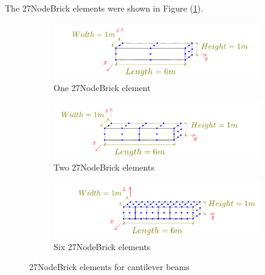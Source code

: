 \documentclass[fleqn,11pt,letter]{article}
\begin{document}
The 27NodeBrick elements were shown in Figure (\ref{fig 27NodeBrick elements for cantilever beams}).

\begin{figure}[H]
  \centering
  \begin{subfigure}{0.5\textwidth}
    \centering
    \includegraphics[width=9cm]{../Figure_files/27NodeBrick/beam_27brick_1div.pdf}
    \caption{One 27NodeBrick element}
  \end{subfigure}
  \vskip 8pt
  \begin{subfigure}{0.5\textwidth}
    \centering
    \includegraphics[width=9cm]{../Figure_files/27NodeBrick/beam_27brick_2div.pdf}
    \caption{Two 27NodeBrick elements}
  \end{subfigure}
  \vskip 8pt
  \begin{subfigure}{0.5\textwidth}
    \centering
    \includegraphics[width=9cm]{../Figure_files/27NodeBrick/beam_27brick_6div.pdf}
    \caption{Six 27NodeBrick elements}
  \end{subfigure}
  \captionsetup{justification=centering,margin=3cm}
  \caption{27NodeBrick elements for cantilever beams}
  \label{fig 27NodeBrick elements for cantilever beams}
\end{figure}





\end{document}
